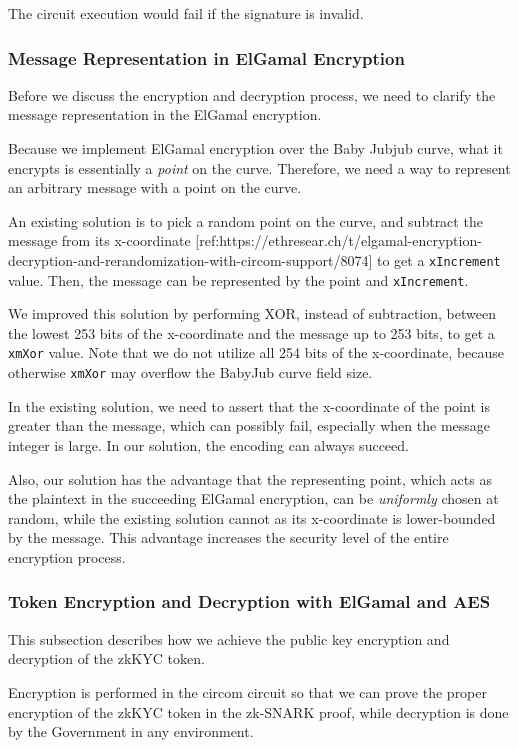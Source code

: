 \documentclass[
]{report}
\begin{document}
The circuit execution would fail if the signature is invalid.

\subsubsection{Message Representation in ElGamal Encryption}

Before we discuss the encryption and decryption process, we need to
clarify the message representation in the ElGamal encryption.

Because we implement ElGamal encryption over the Baby Jubjub curve, what
it encrypts is essentially a \emph{point} on the curve. Therefore, we
need a way to represent an arbitrary message with a point on the curve.

An existing solution is to pick a random point on the curve, and
subtract the message from its x-coordinate
{[}ref:https://ethresear.ch/t/elgamal-encryption-decryption-and-rerandomization-with-circom-support/8074{]}
to get a \texttt{xIncrement} value. Then, the message can be represented
by the point and \texttt{xIncrement}.

We improved this solution by performing XOR, instead of subtraction,
between the lowest 253 bits of the x-coordinate and the message up to
253 bits, to get a \texttt{xmXor} value. Note that we do not utilize all
254 bits of the x-coordinate, because otherwise \texttt{xmXor} may
overflow the BabyJub curve field size.

In the existing solution, we need to assert that the x-coordinate of the
point is greater than the message, which can possibly fail, especially
when the message integer is large. In our solution, the encoding can
always succeed.

Also, our solution has the advantage that the representing point, which
acts as the plaintext in the succeeding ElGamal encryption, can be
\emph{uniformly} chosen at random, while the existing solution cannot as
its x-coordinate is lower-bounded by the message. This advantage
increases the security level of the entire encryption process.

\subsubsection{Token Encryption and Decryption with ElGamal and AES}

This subsection describes how we achieve the public key encryption and
decryption of the zkKYC token.

Encryption is performed in the circom circuit so that we can prove the
proper encryption of the zkKYC token in the zk-SNARK proof, while
decryption is done by the Government in any environment.
\end{document}
